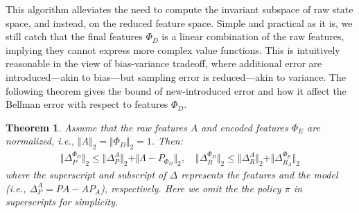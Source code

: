 \documentclass[onecolumn, conference]{IEEEtran}
\newtheorem{theorem}{\textbf{Theorem}}
\begin{document}
This algorithm alleviates the need to compute the invariant subspace of raw state space, and instead, on the reduced feature space. Simple and practical as it is, we still catch that the final features $\Phi_D$ is a linear combination of the raw features, implying they cannot express more complex value functions. This is intuitively reasonable in the view of bias-variance tradeoff, where additional error are introduced—akin to bias—but sampling error is reduced—akin to variance. The following theorem gives the bound of new-introduced error and how it affect the Bellman error with respect to features $\Phi_D$.
\begin{theorem}\label{theorem:nontabular}
	Assume that the raw features $A$ and encoded features $\Phi_E$ are normalized, \textit{i.e.,} $\Vert A\Vert_2 = \Vert \Phi_D\Vert_2 = 1$. Then:
		\begin{align*}
			\Vert \Delta_{P}^{\Phi_D}\Vert_2 \le \Vert \Delta_P^A\Vert_2 + \Vert \Lambda-P_{\Phi_D} \Vert_2,\quad \Vert\Delta_R^{\Phi_D}\Vert_2 \le \Vert \Delta_R^{A}\Vert_2 + \Vert \Delta_{R_A}^{\Phi_E} \Vert_2 
		\end{align*} 
		where the superscript and subscript of $\Delta$ represents the features and the model (\textit{i.e.,} $\Delta_P^A = PA - AP_A$), respectively. Here we omit the the policy $\pi$ in superscripts for simplicity.
\end{theorem}
\end{document}
